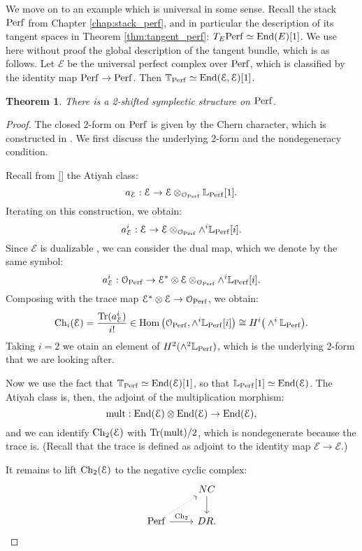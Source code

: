 \documentclass[10pt,a4paper,reqno,oneside]{book} %
\theoremstyle{plain}
\newtheorem{thm}{Theorem}[section]
\theoremstyle{definition}
\theoremstyle{remark}
\numberwithin{equation}{section}
\begin{document}
We move on to an example which is universal in some sense. Recall the stack $\mathrm{Perf}$ from 
Chapter \ref{chap:stack_perf}, and in particular the description of its tangent spaces in Theorem \ref{thm:tangent_perf}:
$T_E \mathrm{Perf} \simeq \operatorname{End}(E)[1]$. We use here without proof the global description of the tangent bundle, which is as
follows. Let $\mathcal{E}$ be the universal perfect complex over $\mathrm{Perf}$, which is classified by the identity
map $\mathrm{Perf} \to \mathrm{Perf}$. Then $\mathbb T_{\mathrm{Perf}} \simeq \operatorname{End}(\mathcal{E}, \mathcal{E})[1]$.

\begin{thm}
\label{thm:symp_perf}
There is a 2-shifted symplectic structure on $\mathrm{Perf}$.
\end{thm}
\begin{proof}
The closed 2-form on $\mathrm{Perf}$ is given by the Chern character, which is constructed in \cite{TV_Chern}. We first discuss
the underlying 2-form and the nondegeneracy condition. 

Recall from \ref{} the Atiyah class:
\[	a_\mathcal{E} : \mathcal{E} \to \mathcal{E} \otimes_{\mathcal{O}_{\mathrm{Perf}}} \mathbb L_{\mathrm{Perf}}[1] .	\]
Iterating on this construction, we obtain:
\[	a_\mathcal{E}^i : \mathcal{E} \to \mathcal{E} \otimes_{\mathcal{O}_{\mathrm{Perf}}} \wedge^i \mathbb L_{\mathrm{Perf}}[i] .	\]
Since $\mathcal{E}$ is dualizable , we can consider the dual map, which we denote by the same
symbol:
\[	a_\mathcal{E}^i : \mathcal{O}_{\mathrm{Perf}} \to \mathcal{E}^* \otimes \mathcal{E} \otimes_{\mathcal{O}_{\mathrm{Perf}}} \wedge^i \mathbb L_{\mathrm{Perf}}[i].	\]
Composing with the trace map $\mathcal{E}^* \otimes \mathcal{E} \to \mathcal{O}_{\mathrm{Perf}}$, we obtain:
\[	\operatorname{Ch}_i(\mathcal E) = \frac{\operatorname{Tr}(a_\mathcal{E}^i)}{i!} \in \operatorname{Hom}\big(\mathcal{O}_{\mathrm{Perf}},\wedge^i \mathbb L_{\mathrm{Perf}}[i]\big) 
\cong H^i\big(\wedge^i \mathbb L_{\mathrm{Perf}}\big) .	\]
Taking $i=2$ we otain an element of $H^2(\wedge^2 \mathbb L_{\mathrm{Perf}})$, which is the underlying 2-form that we are looking after.

Now we use the fact that $\mathbb T_{\mathrm{Perf}} \simeq \operatorname{End}(\mathcal{E})[1]$, so that
$\mathbb L_{\mathrm{Perf}}[1] \simeq \operatorname{End}(\mathcal{E})$. The Atiyah class is, then, the adjoint of the multiplication morphism:
\[	\text{mult} : \operatorname{End}(\mathcal{E}) \otimes \operatorname{End}(\mathcal{E}) \to \operatorname{End}(\mathcal{E}),	\]
and we can identify $\operatorname{Ch}_2(\mathcal{E})$ with $\operatorname{Tr}(\text{mult})/2$, which is nondegenerate because the trace is. (Recall that
the trace is defined as adjoint to the identity map $\mathcal{E} \to \mathcal{E}$.)

It remains to lift $\operatorname{Ch}_2(\mathcal{E})$ to the negative cyclic complex:
\[
\begin{tikzcd}
\; & NC \arrow{d} \\
\Perf \arrow{r}{\Ch_2}\arrow[dotted]{ur} & DR .
\end{tikzcd}
\]
\end{proof}
\end{document}
